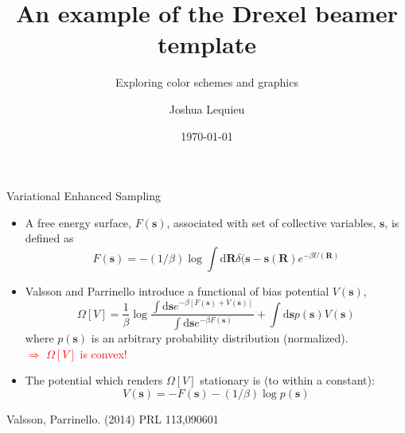 \documentclass{beamer}
\title{An example of the Drexel beamer template}
\subtitle{Exploring color schemes and graphics}
\author{Joshua Lequieu}
\date{\today}
\begin{document}


\maketitle

\begin{frame}{Variational Enhanced Sampling}
\begin{itemize}
\item A free energy surface, $F(\bm{s})$, associated with set of collective variables, $\bm{s}$, is defined as
\begin{equation}
    F(\bm{s}) = - (1/\beta) \log \int \mathrm{d}\bm{R} \delta(\bm{s} - \bm{s}(\bm{R}) e^{-\beta U(\bm{R})}
\end{equation}

\item Valsson and Parrinello introduce a functional of bias potential $V(\bm{s})$,
\begin{equation}
    \Omega[V] = \frac{1}{\beta} \log \frac{\int \textrm{d}\bm{s} e^{-\beta[F(\bm{s}) + V(\bm{s})]}} {\int \textrm{d}\bm{s} e^{-\beta F(\bm{s})}} + \int \textrm{d}\bm{s} p(\bm{s}) V(\bm{s})
\end{equation}
where $p(\bm{s})$ is an arbitrary probability distribution (normalized).
\\\textcolor{red}{$\Rightarrow$ $\Omega[V]$ is convex!}

\item The potential which renders $\Omega[V]$ stationary is (to within a constant):
\begin{equation}
    V(\bm{s}) = - F(\bm{s}) - (1/\beta) \log p(\bm{s})
\end{equation}

\end{itemize}

\tiny \hfill Valsson, Parrinello. (2014) PRL 113,090601 
\end{frame}
\end{document}
